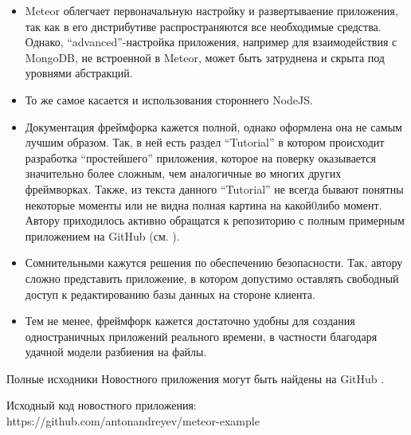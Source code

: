 \documentclass[a4paper,12pt]{article}
\begin{document}
\begin{itemize}
	\item Meteor облегчает первоначальную настройку и развертываение приложения,
	так как в его дистрибутиве распространяются все необходимые средства. Однако,
	``advanced''-настройка приложения, например для взаимодействия с MongoDB,
	не встроенной в Meteor, может быть затруднена и скрыта под уровнями абстракций.
	\item То же самое касается и использования стороннего NodeJS.
	\item Документация фреймфорка кажется полной, однако оформлена она не самым лучшим
	образом. Так, в ней есть раздел ``Tutorial'' в котором происходит разработка
	``простейшего'' приложения, которое на поверку оказывается значительно более
	сложным, чем аналогичные во многих других фреймворках. Также, из текста данного 
	``Tutorial'' не всегда бывают понятны некоторые моменты или не видна
	полная картина на какой0либо момент. Автору приходилось активно обращатся 
	к репозиторию с полным примерным приложением на GitHub (см. \cite{X}).
	\item Сомнительными кажутся решения по обеспечению безопасности.
	Так, автору сложно представить приложение, в котором допустимо оставлять
	свободный доступ к редактированию базы данных на стороне клиента.
	\item Тем не менее, фреймфорк кажется достаточно удобны для создания 
	одностраничных приложений реального времени, в частности благодаря
	удачной модели разбиения на файлы. 
\end{itemize}

Полные исходники Новостного приложения могут быть найдены на GitHub \cite{news-app}.

\begin{thebibliography}{99}
	Исходный код новостного приложения: 
https://github.com/antonandreyev/meteor-example
	
\end{thebibliography}
\end{document}

